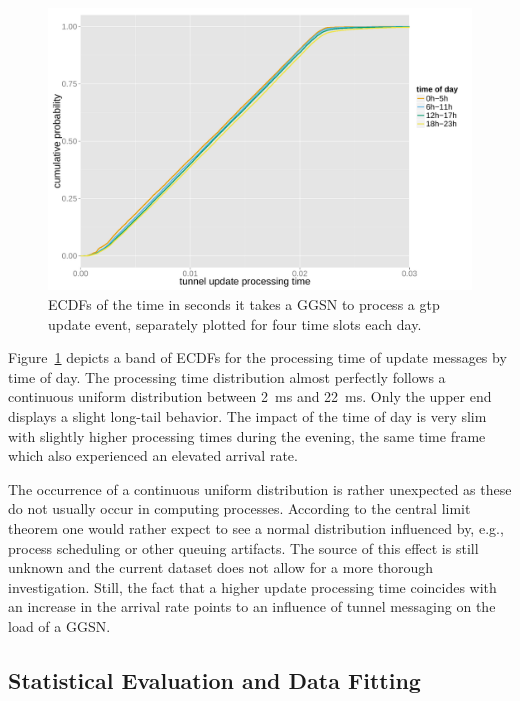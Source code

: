 \begin{figure}[htb]
	\centering
	\includegraphics[width=1.0\textwidth]{images/R-update-time-cdfs.pdf}
	\caption{\glspl{ECDF} of the time in seconds it takes a \gls{GGSN} to process a \gls{gtp} update event, separately plotted for four time slots each day.}
	\label{c4:fig:update-time}
\end{figure}

Figure~\ref{c4:fig:update-time} depicts a band of \glspl{ECDF} for the processing time of update messages by time of day. The processing time distribution almost perfectly follows a continuous uniform distribution between \SI{2}{\milli\second} and \SI{22}{\milli\second}. Only the upper end displays a slight long-tail behavior. The impact of the time of day is very slim with slightly higher processing times during the evening, the same time frame which also experienced an elevated arrival rate.

The occurrence of a continuous uniform distribution is rather unexpected as these do not usually occur in computing processes. According to the central limit theorem one would rather expect to see a normal distribution influenced by, e.g., process scheduling or other queuing artifacts. The source of this effect is still unknown and the current dataset does not allow for a more thorough investigation. Still, the fact that a higher update processing time coincides with an increase in the arrival rate points to an influence of tunnel messaging on the load of a \gls{GGSN}.



\subsection{Statistical Evaluation and Data Fitting}
\label{c4:sec:statistical_evaluation}

